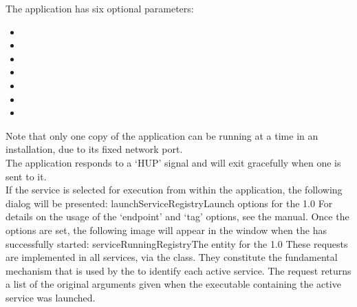 The application has six optional parameters:
\begin{itemize}
\item{}
\item\exSp{}
\item{}
\item\exSp{}
\item\exSp{}
\item\exSp{}
\item\exSp{}
\end{itemize}
Note that only one copy of the  application can be
running at a time in an \mplusm{} installation, due to its fixed \yarp{} network port.\\

The  application responds to a `HUP' signal and will
exit gracefully when one is sent to it.\\

If the service is selected for execution from within the \emph{\CMU} application, the
following dialog will be presented:
%
{launchServiceRegistry}{Launch options for the }{1.0}
\condPage{}
For details on the usage of the `endpoint' and `tag' options, see the \emph{\CMU} manual.
Once the options are set, the following image will appear in the \emph{\CMU} window when
the  has successfully started:
%
{serviceRunningRegistry}{The \emph{\CMU} entity for the
}{1.0}
\secondaryEnd
{}
These requests are implemented in all \mplusm{} services, via the
 class.
They constitute the fundamental mechanism that is used by the
 to identify each active service.
The  request returns a list of the original
arguments given when the executable containing the active service was launched.\\

